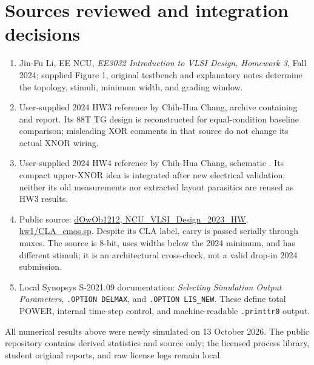 \documentclass[11pt,a4paper]{article}
\begin{document}
\section*{Sources reviewed and integration decisions}
\begin{enumerate}
\item Jin-Fu Li, EE NCU, \emph{EE3032 Introduction to VLSI Design,
Homework 3}, Fall 2024; supplied Figure 1, original testbench and explanatory
notes determine the topology, stimuli, minimum width, and grading window.
\item User-supplied 2024 HW3 reference by Chih-Hua Chang, archive containing
 and report. Its 88T TG design is
reconstructed for equal-condition baseline comparison; misleading XOR
comments in that source do not change its actual XNOR wiring.
\item User-supplied 2024 HW4 reference by Chih-Hua Chang, schematic
. Its compact upper-XNOR idea is
integrated after new electrical validation; neither its old measurements
nor extracted layout parasitics are reused as HW3 results.
\item Public source: \href{https://github.com/dOwOb1212/NCU_VLSI_Design_2023_HW/blob/main/hw1/CLA_cmos.sp}{dOwOb1212, NCU\_VLSI\_Design\_2023\_HW, hw1/CLA\_cmos.sp}.
Despite its CLA label, carry is passed serially through muxes. The source
is 8-bit, uses widths below the 2024 minimum, and has different stimuli;
it is an architectural cross-check, not a valid drop-in 2024 submission.
\item Local Synopsys S-2021.09 documentation: \emph{Selecting Simulation
Output Parameters}, \texttt{.OPTION DELMAX}, and \texttt{.OPTION LIS\_NEW}.
These define total POWER, internal time-step control, and machine-readable
\texttt{.printtr0} output.
\end{enumerate}
All numerical results above were newly simulated on 13 October 2026.
The public repository contains derived statistics and source only; the
licensed process library, student original reports, and raw license logs
remain local.
\end{document}
